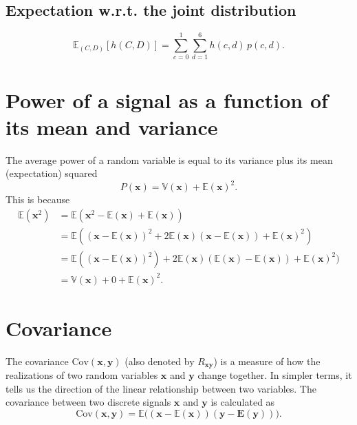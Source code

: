 \subsection*{Expectation w.r.t. the joint distribution}
\[
\mathbb{E}_{(C,D)}[h(C,D)] 
= \sum_{c=0}^{1} \sum_{d=1}^{6} h(c,d) \, p(c,d).
\]


\section{Power of a signal as a function of its mean and variance}
\label{sec:power_mean_variance}
The average power of a random variable is equal to its variance plus its mean
(expectation) squared
\begin{equation}
  P(\mathbf{x}) =  \mathbb{V}(\mathbf{x}) + \mathbb{E}(\mathbf{x})^2.
  \label{eq:power_mean_variance}
\end{equation}
This is because
\begin{align*}
  \mathbb{E}(\mathbf{x}^2)
  & = \mathbb{E}(\mathbf{x}^2 - \mathbb{E}(\mathbf{x}) + \mathbb{E}(\mathbf{x})) \\
  & = \mathbb{E}((\mathbf{x} - \mathbb{E}(\mathbf{x}))^2 + 2\mathbb{E}(\mathbf{x})(\mathbf{x}-\mathbb{E}(\mathbf{x})) + \mathbb{E}(\mathbf{x})^2) \\
  & = \mathbb{E}((\mathbf{x}-\mathbb{E}(\mathbf{x}))^2) + 2\mathbb{E}(\mathbf{x})(\mathbb{E}(\mathbf{x})-\mathbb{E}(\mathbf{x})) + \mathbb{E}(\mathbf{x})^2) \\
  & = \mathbb{V}(\mathbf{x}) + 0 + \mathbb{E}(\mathbf{x})^2.
\end{align*}


\section{Covariance}
\label{sec:covariance}

The covariance $\text{Cov}(\bm{x}, \bm{y})$ (also denoted by
$R_{\bm{x}\bm{y}}$) is a measure of how the realizations of two random
variables $\bm{x}$ and $\bm{y}$ change together. In simpler terms, it
tells us the direction of the linear relationship between two
variables. The covariance between two discrete signals $\bm{x}$
and $\bm{y}$ is calculated as
\begin{equation}
  \text{Cov}(\bm{x}, \bm{y}) = \mathbb{E}\big((\bm{x}-\mathbb{E}(\bm{x}))(\bm{y}-\bm{E}(\bm{y}))\big).
\end{equation}

